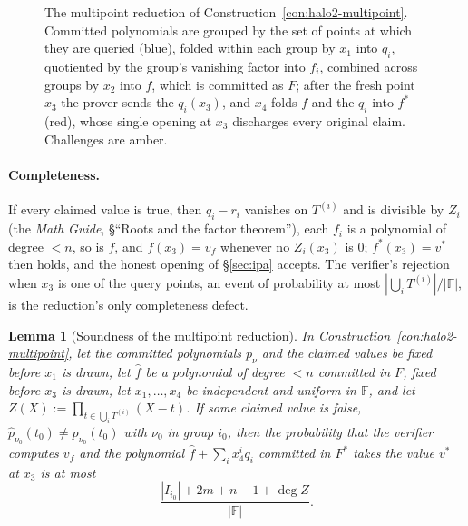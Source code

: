 \documentclass[11pt,a4paper]{article}
\newtheorem{lemma}[theorem]{Lemma}
\theoremstyle{definition}
\newcommand{\F}{\mathbb{F}}
\begin{document}
\begin{figure}[htbp]
\caption{The multipoint reduction of Construction~\ref{con:halo2-multipoint}.
Committed polynomials are grouped by the set of points at which they are
queried (blue), folded within each group by $x_1$ into $q_i$, quotiented
by the group's vanishing factor into $f_i$, combined across groups by
$x_2$ into $f$, which is committed as $F$; after the fresh point $x_3$
the prover sends the $q_i(x_3)$, and $x_4$ folds $f$ and the $q_i$ into
$f^{*}$ (red), whose single opening at $x_3$ discharges every original
claim. Challenges are amber.}
\label{fig:halo2-multipoint}
\end{figure}

\paragraph{Completeness.}
If every claimed value is true, then $q_i - r_i$ vanishes on $T^{(i)}$
and is divisible by $Z_i$ (the \emph{Math Guide}, \S``Roots and the
factor theorem''), each $f_i$ is a polynomial of degree $< n$, so is $f$,
and $f(x_3) = v_f$ whenever no $Z_i(x_3)$ is $0$; $f^{*}(x_3) = v^{*}$
then holds, and the honest opening of \S\ref{sec:ipa} accepts. The
verifier's rejection when $x_3$ is one of the query points, an event of
probability at most $|\bigcup_i T^{(i)}|/|\F|$, is the reduction's only
completeness defect.

\begin{lemma}[Soundness of the multipoint reduction]
\label{lem:halo2-multipoint}
In Construction~\ref{con:halo2-multipoint}, let the committed
polynomials $p_\nu$ and the claimed values be fixed before $x_1$ is drawn,
let $\hat f$ be a polynomial of degree $< n$ committed in $F$, fixed
before $x_3$ is drawn, let $x_1, \dots, x_4$ be independent and uniform
in $\F$, and let
$Z(X) := \prod_{t \in \bigcup_i T^{(i)}}(X - t)$. If some claimed value is
false, $\hat p_{\nu_0}(t_0) \ne p_{\nu_0}(t_0)$ with $\nu_0$ in group
$i_0$, then the probability that the verifier computes $v_f$ and the
polynomial $\hat f + \sum_i x_4^{i} q_i$ committed in $F^{*}$ takes the
value $v^{*}$ at $x_3$ is at most
\[
\frac{|I_{i_0}| + 2m + n - 1 + \deg Z}{|\F|}.
\]
\end{lemma}
\end{document}
